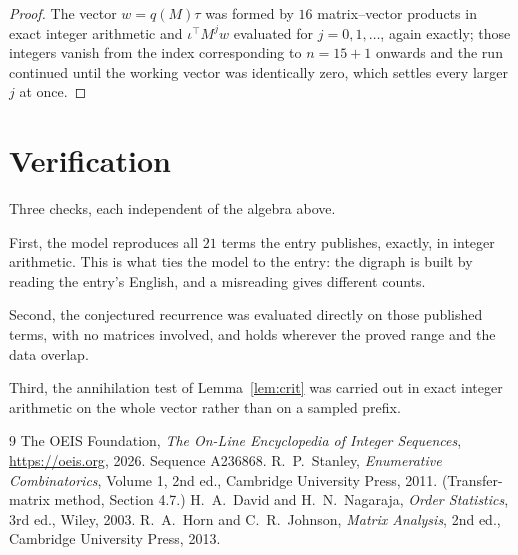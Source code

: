 \documentclass[11pt,a4paper]{article}
\theoremstyle{plain}
\theoremstyle{definition}
\begin{document}
\begin{proof}
The vector $w=q(M)\tau$ was formed by $16$ matrix--vector products in exact integer
arithmetic and $\iota^{\!\top}M^{j}w$ evaluated for $j=0,1,\dots$, again exactly; those
integers vanish from the index corresponding to $n=15+1$ onwards and the run continued
until the working vector was identically zero, which settles every larger $j$ at once.
\end{proof}

\section{Verification}

Three checks, each independent of the algebra above.

First, the model reproduces all $21$ terms the entry publishes, exactly, in integer
arithmetic. This is what ties the model to the entry: the digraph is built by reading the
entry's English, and a misreading gives different counts.

Second, the conjectured recurrence was evaluated directly on those published terms, with no
matrices involved, and holds wherever the proved range and the data overlap.

Third, the annihilation test of Lemma~\ref{lem:crit} was carried out in exact integer
arithmetic on the whole vector rather than on a sampled prefix.

\begin{thebibliography}{9}
 The OEIS Foundation, \emph{The On-Line Encyclopedia of Integer
Sequences}, \url{https://oeis.org}, 2026. Sequence A236868.
 R.~P.~Stanley, \emph{Enumerative Combinatorics}, Volume 1, 2nd ed.,
Cambridge University Press, 2011. (Transfer-matrix method, Section 4.7.)
 H.~A.~David and H.~N.~Nagaraja, \emph{Order Statistics}, 3rd ed., Wiley,
2003.
 R.~A.~Horn and C.~R.~Johnson, \emph{Matrix Analysis}, 2nd ed., Cambridge
University Press, 2013.
\end{thebibliography}
\end{document}

